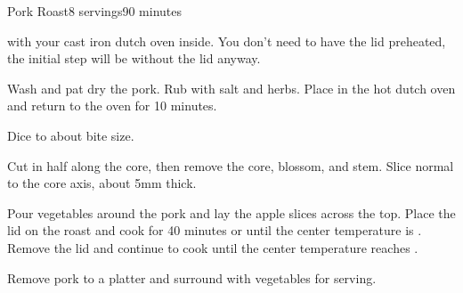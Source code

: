 \documentclass[../Cookbook.tex]{subfiles}
\begin{document}
\begin{recipe}[PorkRoast]{Pork Roast}{8 servings}{90 minutes}

 with your cast iron dutch oven inside.
You don't need to have the lid preheated, the initial step will be without the lid anyway.

Wash and pat dry the pork.
Rub with salt and herbs.
Place in the hot dutch oven and return to the oven for 10 minutes.

Dice to about bite size.

Cut in half along the core, then remove the core, blossom, and stem.
Slice normal to the core axis, about 5mm thick.

\newstep
Pour vegetables around the pork and lay the apple slices across the top.
Place the lid on the roast and cook for 40 minutes or until the center temperature is .
Remove the lid and continue to cook until the center temperature reaches .

Remove pork to a platter and surround with vegetables for serving.

\end{recipe}
\end{document}
